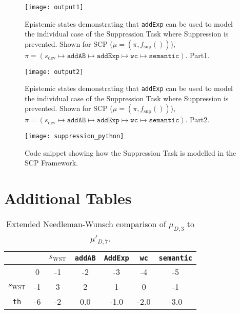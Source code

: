 \begin{figure}
\centering \texttt{[image: output1]}
\caption{Epistemic states demonstrating that \texttt{addExp} can be used to model the individual case of the Suppression Task where Suppression is prevented. Shown for SCP ($\mu=(\pi,f_\text{sup}())$), $\pi = (s_\text{dev} \longmapsto \texttt{addAB} \longmapsto \texttt{addExp} \longmapsto \texttt{wc} \longmapsto \texttt{semantic} )$. Part1.}
\label{fig:suppression_python}
\end{figure}
\begin{figure}
\centering \texttt{[image: output2]}
\caption{Epistemic states demonstrating that \texttt{addExp} can be used to model the individual case of the Suppression Task where Suppression is prevented. Shown for SCP ($\mu=(\pi,f_\text{sup}())$), $\pi = (s_\text{dev} \longmapsto \texttt{addAB} \longmapsto \texttt{addExp} \longmapsto \texttt{wc} \longmapsto \texttt{semantic} )$. Part2.}
\label{fig:suppression_python2}
\end{figure}

\begin{figure}
\centering \texttt{[image: suppression\_python]}
\caption{Code snippet showing how the Suppression Task is modelled in the SCP Framework.}
\label{fig:sup_snippet}
\end{figure}

\section*{Additional Tables}
\begin{table}[h!]
\begin{center}
\begin{tabular}{c | c c c c c c }
 & & $s_\text{WST}$ & \texttt{addAB} & \texttt{AddExp} & \texttt{wc} & \texttt{semantic}\\
\hline
 & 0 & -1 & -2 & -3 & -4 & -5\\
$s_\text{WST}$ & -1 & 3 & 2 & 1 & 0 & -1\\
\texttt{th} & -6 & -2 & 0.0 & -1.0 & -2.0 & -3.0
\end{tabular}
\caption{Extended Needleman-Wunsch comparison of $\mu_{D,3}$ to $\mu'_{D,7}$.}
\label{tbl:extal1}
\end{center}
\end{table}








